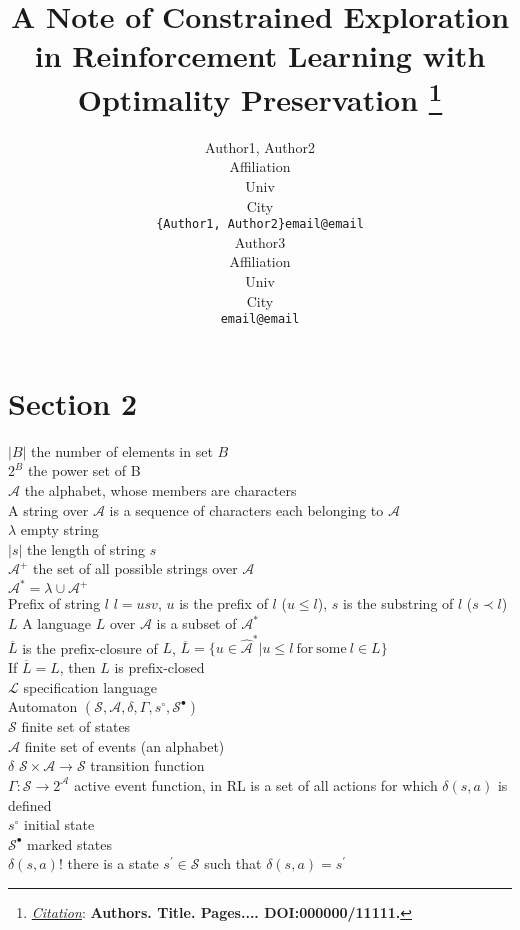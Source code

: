 \documentclass{article}
\title{A Note of Constrained Exploration in Reinforcement Learning with Optimality Preservation
\thanks{\textit{\underline{Citation}}: 
\textbf{Authors. Title. Pages.... DOI:000000/11111.}} 
}
\author{
  Author1, Author2 \\
  Affiliation \\
  Univ \\
  City\\
  \texttt{\{Author1, Author2\}email@email} \\
   \And
  Author3 \\
  Affiliation \\
  Univ \\
  City\\
  \texttt{email@email} \\
}
\begin{document}
\maketitle


\section{Section 2}
$|B|$ \quad the number of elements in set $B$\\
$2^B$ \quad the power set of B \\
$\mathcal{A}$ \quad the alphabet, whose members are characters\\
A string over $\mathcal{A}$ is a sequence of characters each belonging to $\mathcal{A}$\\
$\lambda$ \quad empty string\\
$|s|$ \quad the length of string $s$\\
$\mathcal{A}^{+}$ \quad the set of all possible strings over $\mathcal{A}$\\
$\mathcal{A}^{*} = \lambda \cup \mathcal{A}^{+}$\\
Prefix of string $l$ \quad $l=usv$, $u$ is the prefix of $l$ ($u \leq l$), $s$ is the substring of $l$ ($s\prec l$)\\
$L$ \quad A language $L$ over $\mathcal{A}$ is a subset of $\mathcal{A}^{*}$\\
$\overline{L}$ is the prefix-closure of $L$, $\overline{L}=\{u\in\hat{\mathcal{A}}^{*}|u\leq l \  \mathrm{for} \  \mathrm{some} \   l \in L\}$\\
If $\overline{L}=L$, then $L$ is prefix-closed\\
$\mathcal{L}$ \quad specification language\\
Automaton \quad $(\mathcal{S},\mathcal{A},\delta,\Gamma,s^{\circ},\mathcal{S}^{\bullet})$\\
$\mathcal{S}$ \quad finite set of states\\
$\mathcal{A}$ \quad finite set of events (an alphabet)\\
$\delta$ \quad $\mathcal{S}\times\mathcal{A}\rightarrow\mathcal{S}$ transition function\\
$\Gamma:\mathcal{S}\rightarrow2^{\mathcal{A}}$ \quad active event function, in RL is a set of all actions for which $\delta(s,a)$ is defined\\
$s^{\circ}$ \quad initial state\\
$\mathcal{S}^{\bullet}$ \quad marked states\\
$\delta(s,a)!$ \quad there is a state $s^{\prime} \in \mathcal{S}$ such that $\delta(s,a)=s^{\prime}$\\
\end{document}
